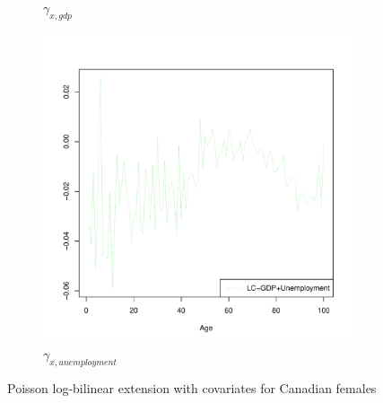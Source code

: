 \documentclass[AER, draftmode]{AEA}
\begin{document}
\begin{figure}[!htp]
\begin{subfigure}{0.4\textwidth}
		\caption{$\gamma_{x,gdp}$}
		\label{fig:femaled} 
	\end{subfigure}
	\begin{subfigure}{0.4\textwidth}
		\includegraphics[width=\linewidth]{CAN_g2x_female} 
		\caption{$\gamma_{x,unemployment}$}
		\label{fig:femalee} 
	\end{subfigure}
	\caption{Poisson log-bilinear extension with covariates for Canadian females}
\end{figure}
\end{document}
